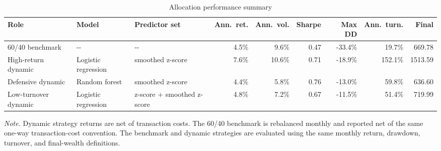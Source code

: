 \begin{table}[!htbp]
\centering
\caption{Allocation performance summary}
\label{tab:allocation-performance-summary}
\small
\setlength{\tabcolsep}{5pt}
\renewcommand{\arraystretch}{1.18}
\begin{adjustbox}{center,max width=\linewidth}
\begin{tabular}{lllrrrrrr}
\toprule
Role & Model & Predictor set & Ann.\ ret. & Ann.\ vol. & Sharpe & Max DD & Ann.\ turn. & Final \\
\midrule
60/40 benchmark & \mbox{-{}-} & \mbox{-{}-} & 4.5\% & 9.6\% & 0.47 & -33.4\% & 19.7\% & 669.78 \\
High-return dynamic & Logistic regression & smoothed z-score & 7.6\% & 10.6\% & 0.71 & -18.9\% & 152.1\% & 1513.59 \\
Defensive dynamic & Random forest & smoothed z-score & 4.4\% & 5.8\% & 0.76 & -13.0\% & 59.8\% & 636.60 \\
Low-turnover dynamic & Logistic regression & z-score + smoothed z-score & 4.8\% & 7.2\% & 0.67 & -11.5\% & 51.4\% & 719.99 \\
\bottomrule
\end{tabular}
\end{adjustbox}
\vspace{0.65em}
\begin{minipage}{0.94\linewidth}
\footnotesize
\emph{Note.} Dynamic strategy returns are net of transaction costs. The 60/40 benchmark is rebalanced monthly and reported net of the same one-way transaction-cost convention. The benchmark and dynamic strategies are evaluated using the same monthly return, drawdown, turnover, and final-wealth definitions.
\end{minipage}
\end{table}
